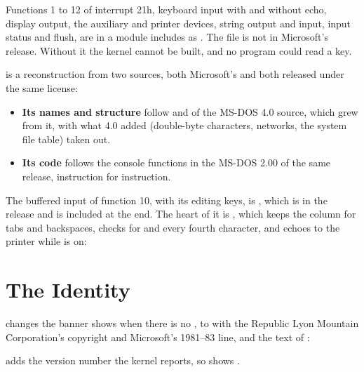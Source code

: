 Functions 1 to 12 of interrupt 21h, keyboard input with and without echo,
display output, the auxiliary and printer devices, string output and
input, input status and flush, are in a module  includes
as . The file is not in Microsoft's release. Without it the
kernel cannot be built, and no program could read a key.

 is a reconstruction from two sources, both Microsoft's
and both released under the same license:

\begin{itemize}
\item \textbf{Its names and structure} follow  and
   of the MS-DOS 4.0 source, which grew from it, with what
  4.0 added (double-byte characters, networks, the system file table) taken
  out.
\item \textbf{Its code} follows the console functions in the MS-DOS 2.00
   of the same release, instruction for instruction.
\end{itemize}

The buffered input of function 10, with its editing keys, is
, which is in the release and is included at the end.
The heart of it is , which keeps the column for tabs and
backspaces, checks for  and  every fourth
character, and echoes to the printer while  is on:



\section{The Identity}

 changes the banner  shows when there is no
, to  with the Republic
Lyon Mountain Corporation's copyright and Microsoft's 1981--83 line, and
the text of :


 adds the version number the kernel reports, so
 shows .

